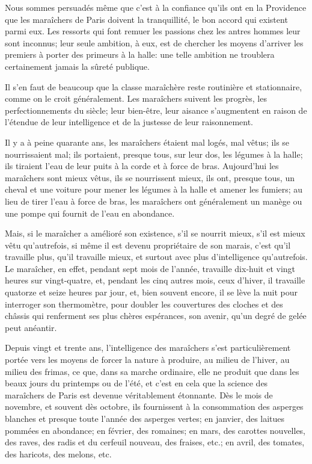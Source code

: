 \documentclass[10pt,a4paper]{book}
\begin{document}
Nous sommes persuadés même que c'est à la confiance qu'ils ont en la Providence que les maraîchers de Paris doivent la tranquillité, le bon accord qui existent parmi eux. Les ressorts qui font remuer les passions chez les antres hommes leur sont inconnus; leur seule ambition, à eux, est de chercher les moyens d'arriver les premiers à porter des primeurs à la halle: une telle ambition ne troublera certainement jamais la sûreté publique.

Il s'en faut de beaucoup que la classe maraîchère reste routinière et stationnaire, comme on le croit généralement. Les maraîchers suivent les progrès, les perfectionnements du siècle; leur bien-être, leur aisance s'augmentent en raison de l'étendue de leur intelligence et de la justesse de leur raisonnement.

Il y a à peine quarante ans, les maraîchers étaient mal logés, mal vêtus; ils se nourrissaient mal; ils portaient, presque tous, sur leur dos, les légumes à la halle; ils tiraient l'eau de leur puits à la corde et à force de bras. Aujourd'hui les maraîchers sont mieux vêtus, ils se nourrissent mieux, ils ont, presque tous, un cheval et une voiture pour mener les légumes à la halle et amener les fumiers; au lieu de tirer l'eau à force de bras, les maraîchers ont généralement un manège ou une pompe qui fournit de l'eau en abondance.

Mais, si le maraîcher a amélioré son existence, s'il se nourrit mieux, s'il est mieux vêtu qu'autrefois, si même il est devenu propriétaire de son marais, c'est qu'il travaille plus, qu'il travaille mieux, et surtout avec plus d'intelligence qu'autrefois. Le maraîcher, en effet, pendant sept mois de l'année, travaille dix-huit et vingt heures sur vingt-quatre, et, pendant les cinq autres mois, ceux d'hiver, il travaille quatorze et seize heures par jour, et, bien souvent encore, il se lève la nuit pour interroger son thermomètre, pour doubler les couvertures des cloches et des châssis qui renferment ses plus chères espérances, son avenir, qu'un degré de gelée peut anéantir.

Depuis vingt et trente ans, l'intelligence des maraîchers s'est particulièrement portée vers les moyens de forcer la nature à produire, au milieu de l'hiver, au milieu des frimas, ce que, dans sa marche ordinaire, elle ne produit que dans les beaux jours du printemps ou de l'été, et c'est en cela que la science des maraîchers de Paris est devenue véritablement étonnante. Dès le mois de novembre, et souvent dès octobre, ils fournissent à la consommation des asperges blanches et presque toute l'année des asperges vertes; en janvier, des laitues pommées en abondance; en février, des romaines; en mars, des carottes nouvelles, des raves, des radis et du cerfeuil nouveau, des fraises, etc.; en avril, des tomates, des haricots, des melons, etc.
\end{document}
